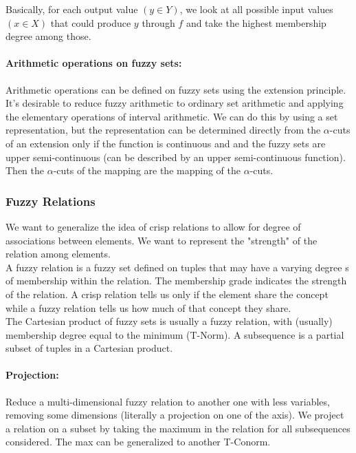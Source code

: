 Basically, for each output value $(y\in Y)$, we look at all possible input values $(x \in X)$ that could produce $y$ through $f$ and take the highest membership degree among those.\\

\paragraph{Arithmetic operations on fuzzy sets:} Arithmetic operations can be defined on fuzzy sets using the extension principle. It's desirable to reduce fuzzy arithmetic to ordinary set arithmetic and applying the elementary operations of interval arithmetic. We can do this by using a set representation, but the representation can be determined directly from the $\alpha$-cuts of an extension only if the function is continuous and and the fuzzy sets are upper semi-continuous (can be described by an upper semi-continuous function). Then the $\alpha$-cuts of the mapping are the mapping of the $\alpha$-cuts.\\

\subsubsection{Fuzzy Relations}
We want to generalize the idea of crisp relations to allow for degree of associations between elements. We want to represent the "strength" of the relation among elements.\\

A fuzzy relation is a fuzzy set defined on tuples that may have a varying degree s of membership within the relation. The membership grade indicates the strength of the relation. A crisp relation tells us only if the element share the concept while a fuzzy relation tells us how much of that concept they share.\\

The Cartesian product of fuzzy sets is usually a fuzzy relation, with (usually) membership degree equal to the minimum (T-Norm). A subsequence is a partial subset of tuples in a Cartesian product.\\

\paragraph{Projection:} Reduce a multi-dimensional fuzzy relation to another one with less variables, removing some dimensions (literally a projection on one of the axis). We project a relation on a subset by taking the maximum in the relation for all subsequences considered. The max can be generalized to another T-Conorm.\\

